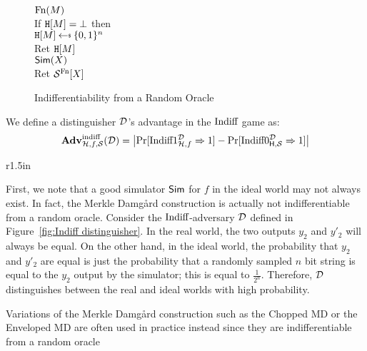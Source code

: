 \begin{figure}[h]
{{            \underline{$\textnormal{Fn}(M)$}\\
            If $\mathtt{H}[M] = \bot$ then\\
            \myInd $\Htable[M] \getsr \bits^n$\\
            Ret $\mathtt{H}[M]$\\
            
            \underline{$\textsf{Sim}(X)$}\\
            Ret $\mathcal{S}^{\textnormal{Fn}}[X]$
        }
    }
    \caption{Indifferentiability from a Random Oracle} \label{fig:Indiff}
\end{figure}

\noindent We define a distinguisher ${\mathcal D}$'s advantage in the $\textnormal{Indiff}$ game as:
\[
\mathbf{Adv}^{\mathrm{indiff}}_{\mathcal{H}, f, \mathcal{S}}({\mathcal D}) = 
\left| 
    \Pr[\textnormal{Indiff}1^{\mathcal D}_{\mathcal{H},f} \Rightarrow 1] 
    - \Pr[\textnormal{Indiff}0^{\mathcal D}_{\mathsf{H},\mathcal{S}} \Rightarrow 1]
\right|
\]

\begin{wrapfigure}{r}{1.5in}
    \centering
    \caption{MD adversary} \label{fig:Indiff distinguisher}
\end{wrapfigure}

\noindent First, we note that a good simulator $\textsf{Sim}$ for $f$ in the ideal world may not always exist. In fact, the Merkle Damg{\aa}rd construction is actually not indifferentiable from a random oracle. Consider the $\textnormal{Indiff}$-adversary ${\mathcal D}$ defined in Figure~\ref{fig:Indiff distinguisher}.
In the real world, the two outputs $y_2$ and $y'_2$ will always be equal. On the other hand, in the ideal world, the probability that $y_2$ and $y'_2$ are equal is just the probability that a randomly sampled $n$ bit string is equal to the $y_2$ output by the simulator; this is equal to $\frac{1}{2^n}$. Therefore, ${\mathcal D}$ distinguishes between the real and ideal worlds with high probability.

Variations of the Merkle Damg{\aa}rd construction such as the Chopped MD or the Enveloped MD are often used in practice instead since they are indifferentiable from a random oracle

